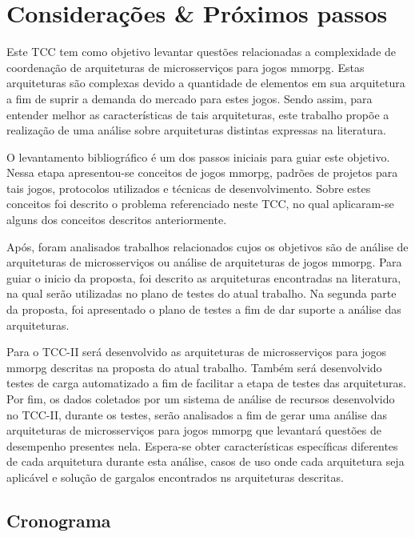 \chapter{Considerações \& Próximos passos}
\label{cap:conclusao}

Este TCC tem como objetivo levantar questões relacionadas a complexidade de coordenação de arquiteturas de microsserviços para jogos \ac{mmorpg}.
%
Estas arquiteturas são complexas devido a quantidade de elementos em sua arquitetura a fim de suprir a demanda do mercado para estes jogos.
%
Sendo assim, para entender melhor as características de tais arquiteturas, este trabalho propõe a realização de uma análise sobre arquiteturas distintas expressas na literatura.



O levantamento bibliográfico é um dos passos iniciais para guiar este objetivo. Nessa etapa apresentou-se conceitos de jogos \ac{mmorpg}, padrões de projetos para tais jogos, protocolos utilizados e técnicas de desenvolvimento.
%
Sobre estes conceitos foi descrito o problema referenciado neste TCC, no qual aplicaram-se alguns dos conceitos descritos anteriormente.



Após, foram analisados trabalhos relacionados cujos os objetivos são de análise de arquiteturas de microsserviços ou análise de arquiteturas de jogos \ac{mmorpg}.
%
Para guiar o inicio da proposta, foi descrito as arquiteturas encontradas na literatura, na qual serão utilizadas no plano de testes do atual trabalho.
%
Na segunda parte da proposta, foi apresentado o plano de testes a fim de dar suporte a análise das arquiteturas.



Para o TCC-II será desenvolvido as arquiteturas de microsserviços para jogos \ac{mmorpg} descritas na proposta do atual trabalho.
%
Também será desenvolvido testes de carga automatizado a fim de facilitar a etapa de testes das arquiteturas.
%
Por fim, os dados coletados por um sistema de análise de recursos desenvolvido no TCC-II, durante os testes, serão analisados a fim de gerar uma análise das arquiteturas de microsserviços para jogos \ac{mmorpg} que levantará questões de desempenho presentes nela.
%
Espera-se obter características específicas diferentes de cada arquitetura durante esta análise, casos de uso onde cada arquitetura seja aplicável e solução de gargalos encontrados ns arquiteturas descritas.

\section{Cronograma}



